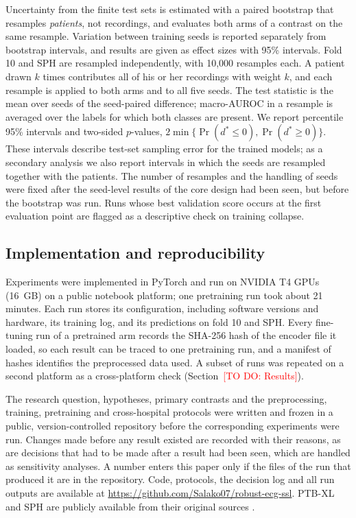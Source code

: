 \documentclass[preprint,12pt]{elsarticle}
\newcommand{\todo}[1]{\textcolor{red}{[TO DO: #1]}}
\begin{document}
Uncertainty from the finite test sets is estimated with a paired bootstrap \cite{efron1993} that resamples \emph{patients}, not recordings, and evaluates both arms of a contrast on the same resample. Variation between training seeds is reported separately from bootstrap intervals, and results are given as effect sizes with 95\% intervals. Fold 10 and SPH are resampled independently, with 10,000 resamples each. A patient drawn $k$ times contributes all of his or her recordings with weight $k$, and each resample is applied to both arms and to all five seeds. The test statistic is the mean over seeds of the seed-paired difference; macro-AUROC in a resample is averaged over the labels for which both classes are present. We report percentile 95\% intervals and two-sided $p$-values, $2\min\{\Pr(d^{*}\leq 0), \Pr(d^{*}\geq 0)\}$. These intervals describe test-set sampling error for the trained models; as a secondary analysis we also report intervals in which the seeds are resampled together with the patients. The number of resamples and the handling of seeds were fixed after the seed-level results of the core design had been seen, but before the bootstrap was run. Runs whose best validation score occurs at the first evaluation point are flagged as a descriptive check on training collapse.

\subsection{Implementation and reproducibility}
\label{sec:repro}

Experiments were implemented in PyTorch and run on NVIDIA T4 GPUs (16~GB) on a public notebook platform; one pretraining run took about 21 minutes. Each run stores its configuration, including software versions and hardware, its training log, and its predictions on fold 10 and SPH. Every fine-tuning run of a pretrained arm records the SHA-256 hash of the encoder file it loaded, so each result can be traced to one pretraining run, and a manifest of hashes identifies the preprocessed data used. A subset of runs was repeated on a second platform as a cross-platform check (Section~\todo{Results}).

The research question, hypotheses, primary contrasts and the preprocessing, training, pretraining and cross-hospital protocols were written and frozen in a public, version-controlled repository before the corresponding experiments were run. Changes made before any result existed are recorded with their reasons, as are decisions that had to be made after a result had been seen, which are handled as sensitivity analyses. A number enters this paper only if the files of the run that produced it are in the repository. Code, protocols, the decision log and all run outputs are available at \url{https://github.com/Salako07/robust-ecg-ssl}. PTB-XL and SPH are publicly available from their original sources \cite{wagner2022physionet,liu2022sph}.



\end{document}
